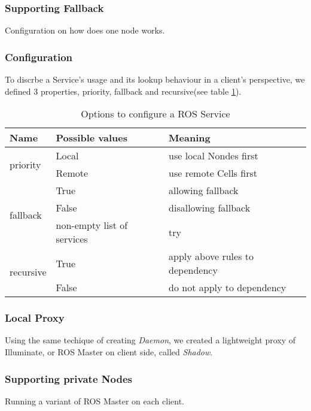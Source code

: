 \subsubsection{Supporting Fallback}
Configuration on how does one node works. 

\subsubsection{Configuration}
To discrbe a Service's usage and its lookup behaviour in a client's perspective, we defined 3 properties, priority, fallback and recursive(see table \ref{table:srv-opt}).

\begin{table}
    \renewcommand{\arraystretch}{1.3}
    \caption{Options to configure a ROS Service}
    \label{table:srv-opt}
    \centering
    \begin{tabular}{|l|l|l|}
        \hline
        \bfseries Name & \bfseries Possible values & \bfseries Meaning \\
        \hline
        \multirow{2}{*}{priority}  & Local  & use local Nondes first \\
        \cline{2-3}
                                   & Remote & use remote Cells first \\
        \hline
        \multirow{3}{*}{fallback}  & True   & allowing fallback \\
        \cline{2-3}
                                   & False  & disallowing fallback \\
        \cline{2-3}
                                   & non-empty list of services & try  \\
        \hline
        \multirow{2}{*}{recursive} & True   & apply above rules to dependency \\
        \cline{2-3}
                                   & False  & do not apply to dependency \\
        \hline
    \end{tabular}
\end{table} 

\subsubsection{Local Proxy}
Using the same techique of creating \emph{Daemon}, we created a lightweight proxy of Illuminate, or ROS Master on client side, called \emph{Shadow}.

\subsubsection{Supporting private Nodes}
Running a variant of ROS Master on each client.


